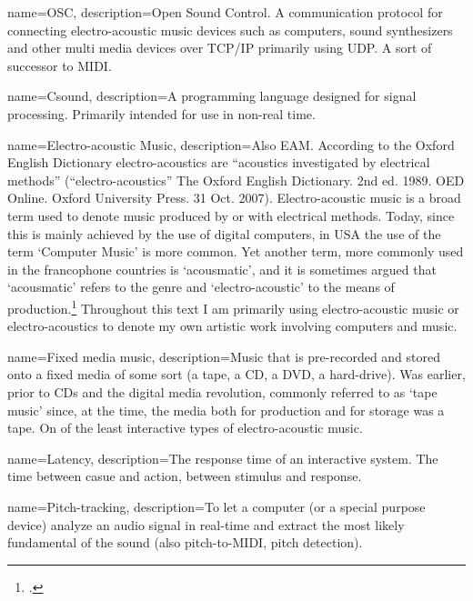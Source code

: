 {name={OSC},
  description={Open Sound Control. A communication protocol for connecting electro-acoustic music devices such as computers, sound synthesizers and other multi media devices over TCP/IP primarily using UDP. A sort of successor to MIDI.}}

{name={Csound},
  description={A programming language designed for signal processing. Primarily intended for use in non-real time.}}

{name={Electro-acoustic Music},
 description={Also EAM. According to the Oxford English Dictionary electro-acoustics are ``acoustics investigated by electrical methods'' (``electro-acoustics'' The Oxford English Dictionary. 2nd ed. 1989. OED Online. Oxford University Press. 31 Oct. 2007). Electro-acoustic music is a broad term used to denote music produced  by or with electrical methods. Today, since this is mainly achieved  by the use of digital computers, in USA the use of the term `Computer Music' is more common. Yet another term, more commonly used in the francophone countries is `acousmatic', and it is sometimes argued that `acousmatic' refers to the genre and `electro-acoustic' to the means of production.\footcite[E.g.][\textparagraph~9]{musique-recherche} Throughout this text I am primarily using electro-acoustic music or electro-acoustics to denote my own artistic work involving computers and music.}}

{name={Fixed media music},
  description={Music that is pre-recorded and stored onto a fixed media of some sort (a tape, a CD, a DVD, a hard-drive). Was earlier, prior to CDs and the digital media revolution, commonly referred to as `tape music' since, at the time, the media both for production and for storage was a tape. On of the least interactive types of electro-acoustic music.}}

{name={Latency},
  description={The response time of an interactive system. The time between casue and action, between stimulus and response.}}

{name={Pitch-tracking},
  description={To let a computer (or a special purpose device) analyze an audio signal in real-time and extract the most likely fundamental of the sound (also pitch-to-MIDI, pitch detection).}}

